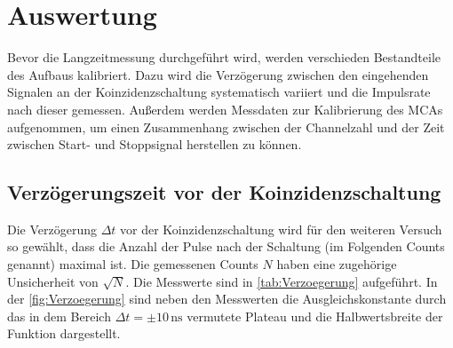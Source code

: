 \section{Auswertung}
\label{sec:Auswertung}
Bevor die Langzeitmessung durchgeführt wird, werden verschieden
Bestandteile des Aufbaus kalibriert. Dazu wird die Verzögerung 
zwischen den eingehenden Signalen an der Koinzidenzschaltung 
systematisch variiert und die Impulsrate nach dieser gemessen. 
Außerdem werden Messdaten zur Kalibrierung des MCAs
aufgenommen, um einen Zusammenhang zwischen der Channelzahl und 
der Zeit zwischen Start- und Stoppsignal herstellen zu können.
\FloatBarrier
\subsection{Verzögerungszeit vor der Koinzidenzschaltung}
Die Verzögerung $\Delta t $ vor der Koinzidenzschaltung wird für 
den weiteren Versuch so gewählt, dass die 
Anzahl der Pulse nach der Schaltung (im Folgenden Counts genannt)
 maximal ist.
Die gemessenen Counts $N$ haben eine zugehörige 
Unsicherheit von $\sqrt{N}$. 
Die Messwerte sind in \autoref{tab:Verzoegerung} aufgeführt. In
der \autoref{fig:Verzoegerung} sind neben den Messwerten die
Ausgleichskonstante durch das in dem Bereich 
$\Delta t = \pm 10 \, \unit{\nano\second}$ vermutete Plateau und die 
Halbwertsbreite der Funktion dargestellt.     

